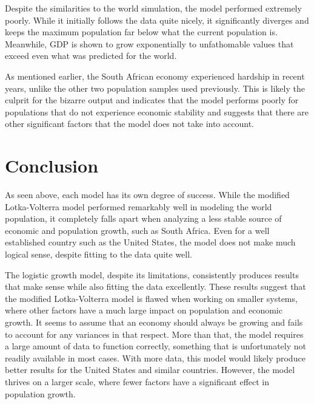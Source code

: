 \documentclass[a4paper]{article}
\begin{document}
Despite the similarities to the world simulation, the model performed extremely poorly. While it initially follows the data quite nicely, it significantly diverges and keeps the maximum population far below what the current population is. Meanwhile, GDP is shown to grow exponentially to unfathomable values that exceed even what was predicted for the world.

As mentioned earlier, the South African economy experienced hardship in recent years, unlike the other two population samples used previously. This is likely the culprit for the bizarre output and indicates that the model performs poorly for populations that do not experience economic stability and suggests that there are other significant factors that the model does not take into account.

\section{Conclusion}

As seen above, each model has its own degree of success. While the modified Lotka-Volterra model performed remarkably well in modeling the world population, it completely falls apart when analyzing a less stable source of economic and population growth, such as South Africa. Even for a well established country such as the United States, the model does not make much logical sense, despite fitting to the data quite well. 

The logistic growth model, despite its limitations, consistently produces results that make sense while also fitting the data excellently. These results suggest that the modified Lotka-Volterra model is flawed when working on smaller systems, where other factors have a much large impact on population and economic growth. It seems to assume that an economy should always be growing and fails to account for any variances in that respect. More than that, the model requires a large amount of data to function correctly, something that is unfortunately not readily available in most cases. With more data, this model would likely produce better results for the United States and similar countries. However, the model thrives on a larger scale, where fewer factors have a significant effect in population growth.

\newpage
\end{document}
